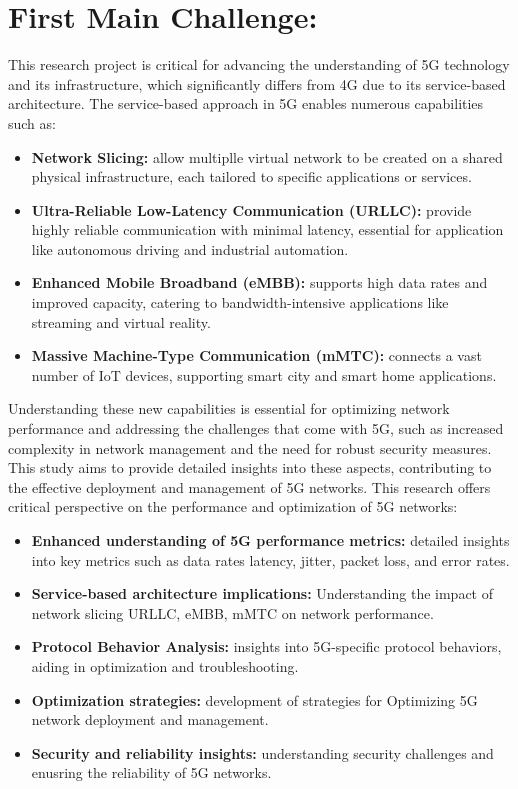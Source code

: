 \documentclass{report}
\begin{document}
\section*{First Main Challenge:}
This research project is critical for advancing the understanding of 5G technology and its infrastructure, which significantly differs from 4G due to its service-based architecture. The service-based approach in 5G enables numerous capabilities such as:
\begin{itemize}
\item \textbf{Network Slicing:} allow multiplle virtual network to be created on a shared physical infrastructure, each tailored to specific applications or services.

\item \textbf{Ultra-Reliable Low-Latency Communication (URLLC):} provide highly reliable communication with minimal latency, essential for application like autonomous driving and industrial automation.

\item \textbf{Enhanced Mobile Broadband (eMBB):} supports high data rates and improved capacity, catering to bandwidth-intensive applications like streaming and virtual reality. 

\item \textbf{Massive Machine-Type Communication (mMTC):} connects a vast number of IoT devices, supporting smart city and smart home applications. 
\end{itemize}
Understanding these new capabilities is essential for optimizing network performance and addressing the challenges that come with 5G, such as increased complexity in network management and the need for robust security measures. This study aims to provide detailed insights into these aspects, contributing to the effective deployment and management of 5G networks. This research offers critical perspective on the performance and optimization of 5G networks:
\begin{itemize}
\item \textbf{Enhanced understanding of 5G performance metrics:} detailed insights into key metrics such as data rates latency, jitter, packet loss, and error rates. 
\item \textbf{Service-based architecture implications:} Understanding the impact of network slicing URLLC, eMBB, mMTC on network performance. 
\item \textbf{Protocol Behavior Analysis:} insights into 5G-specific protocol behaviors, aiding in optimization and troubleshooting.
\item \textbf{Optimization strategies:} development of strategies for Optimizing 5G network deployment and management.
\item \textbf{Security and reliability insights:} understanding security challenges and enusring the reliability of 5G networks.
\end{itemize}
\end{document}
